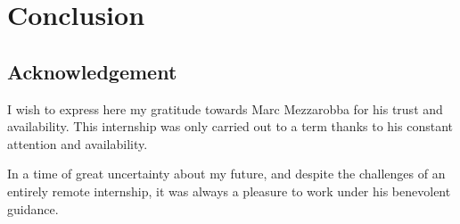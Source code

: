 \documentclass[../main.tex]{subfiles}
\begin{document}
\chapter{Conclusion}

\section*{Acknowledgement}

I wish to express here my gratitude towards Marc Mezzarobba for his trust and availability. This internship was only carried out to a term thanks to his constant attention and availability.

In a time of great uncertainty about my future, and despite the challenges of an entirely remote internship, it was always a pleasure to work under his benevolent guidance.
\end{document}
